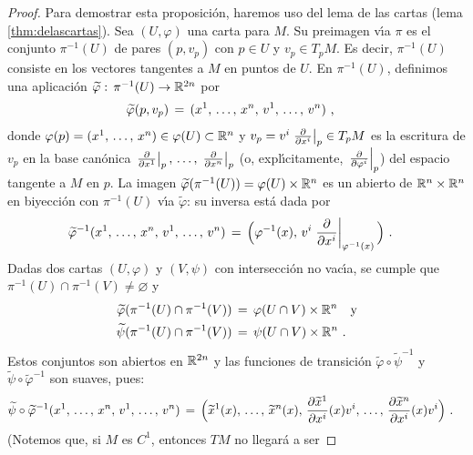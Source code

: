 \begin{proof}
	Para demostrar esta proposici\'{o}n, haremos uso del lema de las
	cartas (lema \ref{thm:delascartas}). Sea $(U,\varphi)$ una carta
	para $M$. Su preimagen v\'{\i}a $\pi$ es el conjunto
	$\pi^{-1}(U)$ de pares $(p,v_{p})$ con $p\in U$ y $v_{p}\in T_{p}M$.
	Es decir, $\pi^{-1}(U)$ consiste en los vectores tangentes a $M$ en
	puntos de $U$. En $\pi^{-1}(U)$, definimos una aplicaci\'{o}n
	$\widetilde{\varphi}:\,\pi^{-1}(U)\rightarrow\mathbb{R}^{2n}$ por
	\begin{align*}
		\widetilde{\varphi}(p,v_{p}) & \,=\,
			(\lista*{x}{n},\,\lista*{v}{n})
		\text{ ,}
	\end{align*}
	donde $\varphi(p)=(\lista*{x}{n})\in\varphi(U)\subset\bb{R}^{n}$ y
	$v_{p}=v^{i}\gancho[p]{x^{i}}\in T_{p}M$ es la escritura de $v_{p}$
	en la base can\'{o}nica $\gancho[p]{x^{1}},\,\dots,\,\gancho[p]{x^{n}}$
	(o, expl\'{\i}citamente, $\gancho[p]{\varphi^{i}}$) del espacio
	tangente a $M$ en $p$. La imagen $\widetilde{\varphi}(\pi^{-1}(U))=%
	\varphi(U)\times\bb{R}^{n}$ es un abierto de
	$\mathbb{R}^{n}\times\mathbb{R}^{n}$ en biyecci\'{o}n con $\pi^{-1}(U)$
	v\'{\i}a $\widetilde{\varphi}$: su inversa est\'{a} dada por
	\begin{align*}
		\widetilde{\varphi}^{-1}(\lista*{x}{n},\,\lista*{v}{n}) &
		\,=\,\Big(
		\varphi^{-1}(x),\,v^{i}\gancho[\varphi^{-1}(x)]{x^{i}}\Big)
		\text{ .}
	\end{align*}
	Dadas dos cartas $(U,\varphi)$ y $(V,\psi)$ con intersecci\'{o}n
	no vac\'{\i}a, se cumple que $\pi^{-1}(U)\cap\pi^{-1}(V)\not =%
	\varnothing$ y
	\begin{align*}
		\widetilde{\varphi}(\pi^{-1}(U)\cap\pi^{-1}(V)) & \,=\,
			\varphi(U\cap V)\times\mathbb{R}^{n}\quad\text{y} \\
		\widetilde{\psi}(\pi^{-1}(U)\cap\pi^{-1}(V)) & \,=\,
			\psi(U\cap V)\times\mathbb{R}^{n}
		\text{ .}
	\end{align*}
	Estos conjuntos son abiertos en $\mathbb{R}^{2n}$ y las funciones de
	transici\'{o}n $\widetilde{\varphi}\circ\widetilde{\psi}^{-1}$ y
	$\widetilde{\psi}\circ\widetilde{\varphi}^{-1}$ son suaves, pues:
	\begin{align*}
		\widetilde{\psi}\circ\widetilde{\varphi}^{-1}
			(\lista*{x}{n},\,\lista*{v}{n}) & \,=\,
			\Big(
			\widetilde{x}^{1}(x),\,\dots,\,\widetilde{x}^{n}(x),\,
			\derivada{\widetilde{x}^{1}}{x^{i}}(x)v^{i},\,\dots,\,
			\derivada{\widetilde{x}^{n}}{x^{i}}(x)v^{i}
			\Big)
		\text{ .}
	\end{align*}
	(Notemos que, si $M$ es $C^{1}$, entonces $TM$ no llegar\'{a} a ser

\end{proof}
